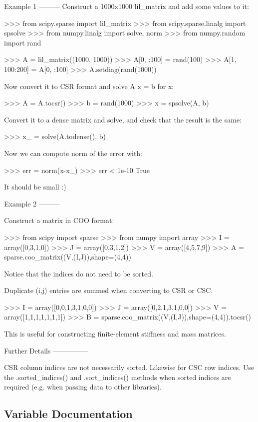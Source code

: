 \begin{DoxyVerb}
Example 1
---------
Construct a 1000x1000 lil_matrix and add some values to it:

>>> from scipy.sparse import lil_matrix
>>> from scipy.sparse.linalg import spsolve
>>> from numpy.linalg import solve, norm
>>> from numpy.random import rand

>>> A = lil_matrix((1000, 1000))
>>> A[0, :100] = rand(100)
>>> A[1, 100:200] = A[0, :100]
>>> A.setdiag(rand(1000))

Now convert it to CSR format and solve A x = b for x:

>>> A = A.tocsr()
>>> b = rand(1000)
>>> x = spsolve(A, b)

Convert it to a dense matrix and solve, and check that the result
is the same:

>>> x_ = solve(A.todense(), b)

Now we can compute norm of the error with:

>>> err = norm(x-x_)
>>> err < 1e-10
True

It should be small :)


Example 2
---------

Construct a matrix in COO format:

>>> from scipy import sparse
>>> from numpy import array
>>> I = array([0,3,1,0])
>>> J = array([0,3,1,2])
>>> V = array([4,5,7,9])
>>> A = sparse.coo_matrix((V,(I,J)),shape=(4,4))

Notice that the indices do not need to be sorted.

Duplicate (i,j) entries are summed when converting to CSR or CSC.

>>> I = array([0,0,1,3,1,0,0])
>>> J = array([0,2,1,3,1,0,0])
>>> V = array([1,1,1,1,1,1,1])
>>> B = sparse.coo_matrix((V,(I,J)),shape=(4,4)).tocsr()

This is useful for constructing finite-element stiffness and mass matrices.

Further Details
---------------

CSR column indices are not necessarily sorted.  Likewise for CSC row
indices.  Use the .sorted_indices() and .sort_indices() methods when
sorted indices are required (e.g. when passing data to other libraries).\end{DoxyVerb}
 

\subsection{Variable Documentation}
\hypertarget{namespacescipy_1_1sparse_a012f619dd03343fa320a2b36b9710de3}{}
